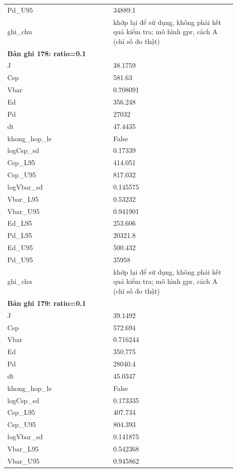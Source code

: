\begin{longtable}{p{0.43\linewidth}p{0.50\linewidth}}
Pd\_\allowbreak U95 & 34889.1 \\
ghi\_\allowbreak chu & khớp lại để sử dụng, không phải kết quả kiểm tra; mô hình gpr, cách A (chỉ số đo thật) \\
\midrule
\multicolumn{2}{p{0.95\linewidth}}{\textbf{Bản ghi 178: ratio=0.1}} \\
J & 38.1759 \\
Csp & 581.63 \\
Vbar & 0.708091 \\
Ed & 356.248 \\
Pd & 27032 \\
dt & 47.4435 \\
khong\_\allowbreak hop\_\allowbreak le & False \\
logCsp\_\allowbreak sd & 0.17339 \\
Csp\_\allowbreak L95 & 414.051 \\
Csp\_\allowbreak U95 & 817.032 \\
logVbar\_\allowbreak sd & 0.145575 \\
Vbar\_\allowbreak L95 & 0.53232 \\
Vbar\_\allowbreak U95 & 0.941901 \\
Ed\_\allowbreak L95 & 253.606 \\
Pd\_\allowbreak L95 & 20321.8 \\
Ed\_\allowbreak U95 & 500.432 \\
Pd\_\allowbreak U95 & 35958 \\
ghi\_\allowbreak chu & khớp lại để sử dụng, không phải kết quả kiểm tra; mô hình gpr, cách A (chỉ số đo thật) \\
\midrule
\multicolumn{2}{p{0.95\linewidth}}{\textbf{Bản ghi 179: ratio=0.1}} \\
J & 39.1492 \\
Csp & 572.694 \\
Vbar & 0.716244 \\
Ed & 350.775 \\
Pd & 28040.4 \\
dt & 45.0347 \\
khong\_\allowbreak hop\_\allowbreak le & False \\
logCsp\_\allowbreak sd & 0.173335 \\
Csp\_\allowbreak L95 & 407.734 \\
Csp\_\allowbreak U95 & 804.393 \\
logVbar\_\allowbreak sd & 0.141875 \\
Vbar\_\allowbreak L95 & 0.542368 \\
Vbar\_\allowbreak U95 & 0.945862 \\

\end{longtable}
